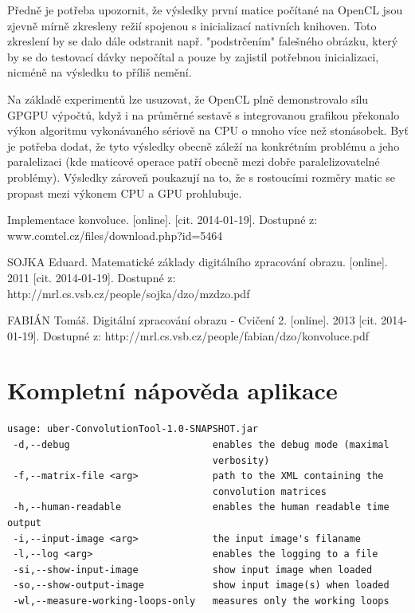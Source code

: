 \documentclass[10pt,a4paper]{article}
\begin{document}
Předně je potřeba upozornit, že výsledky první matice počítané na OpenCL jsou zjevně mírně zkresleny režií spojenou s inicializací nativních knihoven. Toto zkreslení by se dalo dále odstranit např. "podstrčením" falešného obrázku, který by se do testovací dávky nepočítal a pouze by zajistil potřebnou inicializaci, nicméně na výsledku to příliš nemění.

Na základě experimentů lze usuzovat, že OpenCL plně demonstrovalo sílu GPGPU výpočtů, když i na průměrné sestavě s integrovanou grafikou překonalo výkon algoritmu vykonávaného sériově na CPU o mnoho více než stonásobek. Byť je potřeba dodat, že tyto výsledky obecně záleží na konkrétním problému a jeho paralelizaci (kde maticové operace patří obecně mezi dobře paralelizovatelné problémy). Výsledky zároveň poukazují na to, že s rostoucími rozměry matic se propast mezi výkonem CPU a GPU prohlubuje.

\begin{thebibliography}{9}

	 Implementace konvoluce. [online]. [cit. 2014-01-19]. Dostupné z: www.comtel.cz/files/download.php?id=5464
	
	 SOJKA Eduard. Matematické základy digitálního zpracování obrazu. [online]. 2011 [cit. 2014-01-19]. Dostupné z: http://mrl.cs.vsb.cz/people/sojka/dzo/mzdzo.pdf
	
	 FABIÁN Tomáš. Digitální zpracování obrazu - Cvičení 2. [online]. 2013 [cit. 2014-01-19]. Dostupné z: http://mrl.cs.vsb.cz/people/fabian/dzo/konvoluce.pdf
	
\end{thebibliography}

\appendix 
\section{Kompletní nápověda aplikace}
\label{help}

\begin{verbatim}
usage: uber-ConvolutionTool-1.0-SNAPSHOT.jar
 -d,--debug                         enables the debug mode (maximal
                                    verbosity)
 -f,--matrix-file <arg>             path to the XML containing the
                                    convolution matrices
 -h,--human-readable                enables the human readable time output
 -i,--input-image <arg>             the input image's filaname
 -l,--log <arg>                     enables the logging to a file
 -si,--show-input-image             show input image when loaded
 -so,--show-output-image            show input image(s) when loaded
 -wl,--measure-working-loops-only   measures only the working loops


\end{verbatim}
\end{document}
